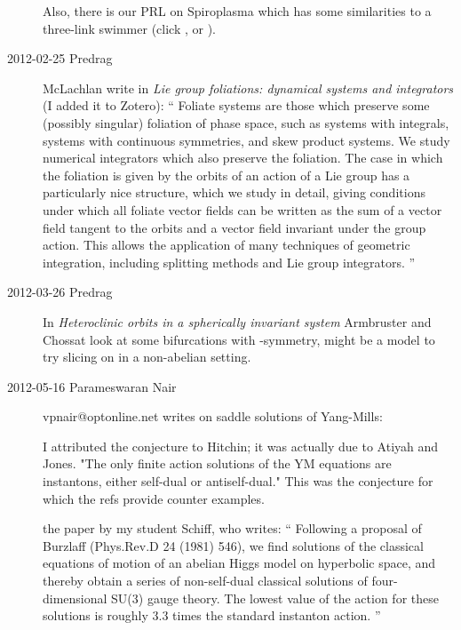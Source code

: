 \begin{description}
Also, there is our PRL on Spiroplasma which has some
similarities to a three-link swimmer (click
,
or
).

\item[2012-02-25 Predrag]
{McLachlan} \etal{} write in
{\em Lie group foliations: dynamical systems and integrators}
(I added it to Zotero): ``
Foliate systems are those which preserve some (possibly
singular) foliation of phase space, such as systems with integrals,
systems with continuous symmetries, and skew product systems. We study
numerical integrators which also preserve the foliation. The case in
which the foliation is given by the orbits of an action of a Lie group
has a particularly nice structure, which we study in detail, giving
conditions under which all foliate vector fields can be written as the
sum of a vector field tangent to the orbits and a vector field invariant
under the group action. This allows the application of many techniques of
geometric integration, including splitting methods and Lie group
integrators.
''

\item[2012-03-26 Predrag]
In \emph{Heteroclinic orbits in a spherically invariant system}
Armbruster and Chossat look at some bifurcations with
-symmetry, might be a model to try slicing on in a non-abelian
setting.

\item[2012-05-16  Parameswaran Nair]  vpnair@optonline.net writes
on saddle solutions of Yang-Mills:

I attributed the conjecture to Hitchin; it was actually due to Atiyah and
Jones. "The only finite action solutions of the YM equations are
instantons, either self-dual or antiself-dual." This was the conjecture
for which the refs provide counter examples.

 the paper by my
student Schiff, who writes:
``
Following a proposal of Burzlaff (Phys.Rev.D 24 (1981) 546), we find
solutions of the classical equations of motion of an abelian Higgs model
on hyperbolic space, and thereby obtain a series of non-self-dual
classical solutions of four-dimensional SU(3) gauge theory. The lowest
value of the action for these solutions is roughly 3.3 times the standard
instanton action.
''


\end{description}
